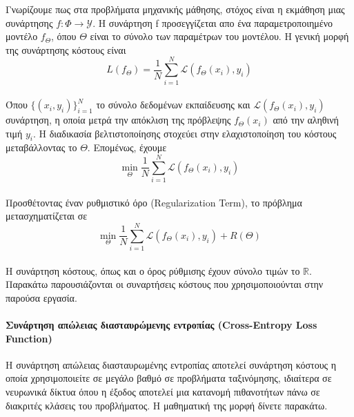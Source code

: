 \documentclass[12pt]{article}
\numberwithin{equation}{section}
\begin{document}
Γνωρίζουμε πως στα προβλήματα μηχανικής μάθησης, στόχος είναι η εκμάθηση μιας συνάρτησης \(f : \Phi \rightarrow \mathcal{Y}\). Η συνάρτηση f προσεγγίζεται απο ένα παραμετροποιημένο μοντέλο \(f_{\Theta}\), όπου \(\Theta\) είναι το σύνολο των παραμέτρων του μοντέλου. Η γενική μορφή της συνάρτησης κόστους είναι\\

\begin{equation}
L(f_\Theta) = \frac{1}{N} \sum_{i=1}^N \mathcal{L}(f_\Theta(x_i), y_i)
\end{equation} \\

\noindent Όπου \( \{(x_i, y_i)\}_{i=1}^N \) το σύνολο δεδομένων εκπαίδευσης και \( \mathcal{L}(f_\Theta(x_i), y_i) \) συνάρτηση, η οποία μετρά την απόκλιση της πρόβλεψης \(f_\Theta(x_i)\) από την αληθινή τιμή \(y_i\). Η διαδικασία βελτιστοποίησης στοχεύει στην ελαχιστοποίηση του κόστους μεταβάλλοντας το \(\Theta\). Επομένως, έχουμε\\

\begin{equation}
\min_{\Theta} \frac{1}{N} \sum_{i=1}^N \mathcal{L}(f_\Theta(x_i), y_i)
\end{equation}\\

\noindent Προσθέτοντας έναν ρυθμιστικό όρο (Regularization Term), το πρόβλημα μετασχηματίζεται σε\\

\begin{equation}
\min_{\Theta} \frac{1}{N} \sum_{i=1}^N \mathcal{L}(f_\Theta(x_i), y_i) + R(\Theta)
\end{equation}\\

\noindent Η συνάρτηση κόστους, όπως και ο όρος ρύθμισης έχουν σύνολο τιμών το \(\mathbb{R}\). Παρακάτω παρουσιάζονται οι συναρτήσεις κόστους που χρησιμοποιούνται στην παρούσα εργασία. \\

\paragraph{Συνάρτηση απώλειας διασταυρώμενης εντροπίας (Cross-Entropy Loss Function)\\ [0.5 cm]}

Η συνάρτηση απώλειας διασταυρωμένης εντροπίας αποτελεί συνάρτηση κόστους η οποία χρησιμοποιείτε σε μεγάλο βαθμό σε προβλήματα ταξινόμησης, ιδιαίτερα σε νευρωνικά δίκτυα όπου η έξοδος αποτελεί μια κατανομή πιθανοτήτων πάνω σε διακριτές κλάσεις του προβλήματος. Η μαθηματική της μορφή δίνετε παρακάτω. \\
\end{document}
